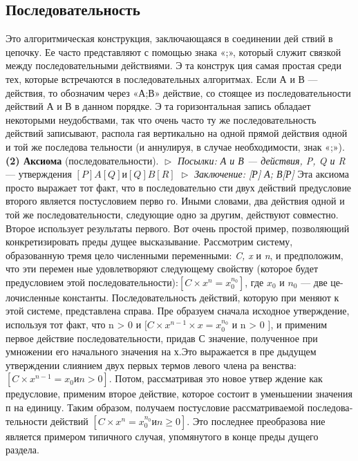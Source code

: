 \documentclass{mai_book}
\begin{document}
\subsection{Последовательность}
Это  алгоритмическая конструкция,  заключающаяся  в соединении  дей­
ствий  в цепочку.  Ее часто представляют с помощью знака «;», который 
служит связкой  между  последовательными  действиями.  Э та конструк­
ция самая простая среди тех, которые встречаются в последовательных 
алгоритмах.
\parindent=1cm Если А и В — действия,  то обозначим  через  «А;В» действие, со­
стоящее из последовательности действий А и В в данном порядке. Э та 
горизонтальная запись обладает некоторыми неудобствами, так что 
очень часто ту же последовательность действий записывают, распола­
гая вертикально на одной прямой действия одной и той же последова­
тельности (и аннулируя, в случае необходимости, знак «;»).
\newline
\textbf{(2) Аксиома} (последовательности).
\newline
$\vartriangleright$ \textit{Посылки: А и В --- действия, P, Q и R} --- утверждения
\textit{$                            [ P ] A [ Q ]  и [Q] B [ R ]$}
\pagebreak
$\vartriangleright$ \textit{Заключение:  [Р] А; В[Р]}
\newline
\parindent=1cm Эта  аксиома  просто  выражает  тот  факт,  что  в  последовательно­
сти двух действий  предусловие  второго является  постусловием  перво­
го. Иными словами, два действия одной и той же последовательности, 
следующие  одно за другим,  действуют  совместно.  Второе  использует 
результаты первого.
\parindent=1cm Вот очень простой пример, позволяющий конкретизировать преды­
дущее  высказывание.  Рассмотрим систему,  образованную тремя цело­
численными переменными: \textit{C, x} и \textit{n}, и предположим, что эти перемен­
ные удовлетворяют следующему свойству (которое будет предусловием 
этой последовательности):\textit{$[C\times x^{n} = x_{0}^{n_{0}}]$}, где \textit{$x_{0}$} и \textit{$n_{0}$} --- две це-
лочисленные константы. Последовательность действий,  которую  при­
меняют  к  этой  системе,  представлена  справа.  Пре­
образуем сначала исходное утверждение,  используя тот 
факт, что n > 0 и \textit{$[C\times x^{n-1} \times x = x_{0}^{n_{0}}$} и n > 0 ], и применим
первое  действие  последовательности,  придав С значение,  полученное 
при умножении его начального значения  на х.Это выражается  в пре­
дыдущем утверждении  слиянием двух первых термов левого члена ра­
венства: \textit{$[C\times x^{n-1} = x_{0} и n > 0]$}. Потом, рассматривая это новое утвер­
ждение как  предусловие,  применим  второе действие, которое состоит 
в уменьшении значения п на единицу.
\parindent=1cm Таким образом, получаем постусловие  рассматриваемой последова­
тельности действий \textit{$[C\times x^{n} = x_{0}^{n_{0}} и n \geqslant 0]$}. Это последнее преобразова­
ние является примером типичного случая, упомянутого в конце преды­
дущего раздела.
\end{document}
